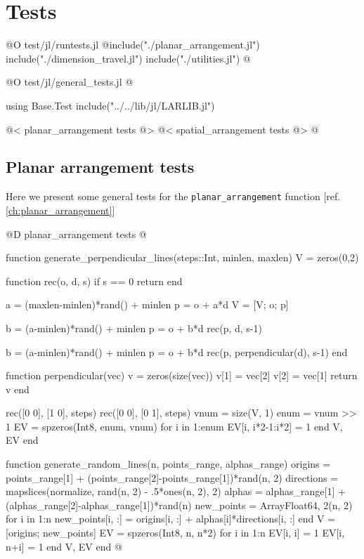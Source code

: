 \chapter{Tests}

@O test/jl/runtests.jl
@{include("./planar_arrangement.jl")
include("./dimension_travel.jl")
include("./utilities.jl")
@}

@O test/jl/general_tests.jl
@{using Base.Test
include("../../lib/jl/LARLIB.jl")

@< planar\_arrangement tests @>
@< spatial\_arrangement tests @>
@}

\section{Planar arrangement tests}
\label{ch:planar_arrangement_tests}

Here we present some general tests for the \texttt{planar\_arrangement} function [ref. \ref{ch:planar_arrangement}]

@D planar\_arrangement tests
@{function generate_perpendicular_lines(steps::Int, minlen, maxlen)
    V = zeros(0,2)

    function rec(o, d, s)
        if s == 0 return end

        a = (maxlen-minlen)*rand() + minlen
        p = o + a*d
        V = [V; o; p]

        b = (a-minlen)*rand() + minlen
        p = o + b*d
        rec(p, d, s-1)

        b = (a-minlen)*rand() + minlen
        p = o + b*d
        rec(p, perpendicular(d), s-1)
    end

    function perpendicular(vec)
        v = zeros(size(vec))
        v[1] = vec[2]
        v[2] = vec[1]
        return v
    end

    rec([0 0], [1 0], steps)
    rec([0 0], [0 1], steps)
    vnum = size(V, 1)
    enum = vnum >> 1
    EV = spzeros(Int8, enum, vnum)
    for i in 1:enum
        EV[i, i*2-1:i*2] = 1
    end
    V, EV
end


function generate_random_lines(n, points_range, alphas_range)
    origins = points_range[1] + (points_range[2]-points_range[1])*rand(n, 2)
    directions = mapslices(normalize, rand(n, 2) - .5*ones(n, 2), 2)
    alphas = alphas_range[1] + (alphas_range[2]-alphas_range[1])*rand(n)
    new_points = Array{Float64, 2}(n, 2)
    for i in 1:n
        new_points[i, :] = origins[i, :] + alphas[i]*directions[i, :]
    end
    V = [origins; new_points]
    EV = spzeros(Int8, n, n*2)
    for i in 1:n
        EV[i, i] = 1
        EV[i, n+i] = 1
    end
    V, EV
end
@}

